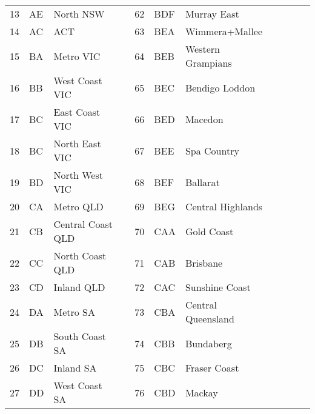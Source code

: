 \begin{table}[H]
{\begin{tabular}{lllllllllll}
				13	& AE & North NSW 			&  & 62  & BDF & Murray East &&&&\\
				14	& AC & ACT					&  & 63  & BEA & Wimmera+Mallee &&&&\\
				15	& BA & Metro VIC			&  & 64  & BEB & Western Grampians &&&&\\ 		
				16	& BB & West Coast VIC		&  & 65  & BEC & Bendigo Loddon &&&&\\
				17	& BC & East Coast VIC		&  & 66  & BED & Macedon &&&&\\
				18	& BC & North East VIC		&  & 67  & BEE & Spa Country &&&&\\
				19	& BD & North West VIC		&  & 68  & BEF & Ballarat &&&&\\
				20  & CA & Metro QLD			&  & 69  & BEG & Central Highlands &&&&\\
				21  & CB & Central Coast QLD	&  & 70  & CAA & Gold Coast &&&&\\
				22  & CC & North Coast QLD		&  & 71  & CAB & Brisbane &&&&\\
				23  & CD & Inland QLD			&  & 72  & CAC & Sunshine Coast &&&&\\
				24	& DA & Metro SA				&  & 73  & CBA & Central Queensland &&&&\\	
				25	& DB & South Coast SA		&  & 74  & CBB & Bundaberg &&&&\\	
				26	& DC & Inland SA			&  & 75  & CBC & Fraser Coast &&&&\\	
				27	& DD & West Coast SA		&  & 76  & CBD & Mackay &&&&\\	
				

\end{tabular}}
\end{table}
